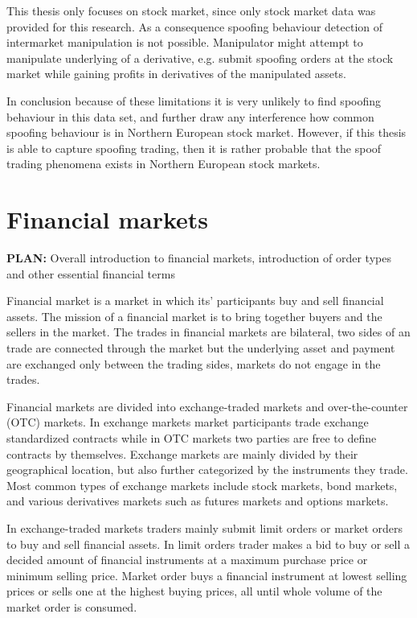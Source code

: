 \documentclass{tut-thesis}
\begin{document}
This thesis only focuses on stock market, since only stock market data was provided for this research. As a consequence spoofing behaviour detection of intermarket manipulation is not possible. Manipulator might attempt to manipulate underlying of a derivative, e.g. submit spoofing orders at the stock market while gaining profits in derivatives of the manipulated assets.

In conclusion because of these limitations it is very unlikely to find spoofing behaviour in this data set, and further draw any interference how common spoofing behaviour is in Northern European stock market. However, if this thesis is able to capture spoofing trading, then it is rather probable that the spoof trading phenomena exists in Northern European stock markets.

\chapter{Financial markets}
\textbf{PLAN:} Overall introduction to financial markets, introduction of order types and other essential financial terms

Financial market is a market in which its' participants buy and sell financial assets. The mission of a financial market is to bring together buyers and the sellers in the market. The trades in financial markets are bilateral, two sides of an trade are connected through the market but the underlying asset and payment are exchanged only between the trading sides, markets do not engage in the trades.

Financial markets are divided into exchange-traded markets and over-the-counter (OTC) markets. In exchange markets market participants trade exchange standardized contracts while in OTC markets two parties are free to define contracts by themselves. Exchange markets are mainly divided by their geographical location, but also further categorized by the instruments they trade. Most common types of exchange markets include stock markets, bond markets, and various derivatives markets such as futures markets and options markets. \autocite{Hull2017}

In exchange-traded markets traders mainly submit limit orders or market orders to buy and sell financial assets. In limit orders trader makes a bid to buy or sell a decided amount of financial instruments at a maximum purchase price or minimum selling price. Market order buys a financial instrument at lowest selling prices or sells one at the highest buying prices, all until whole volume of the market order is consumed. 
\end{document}
